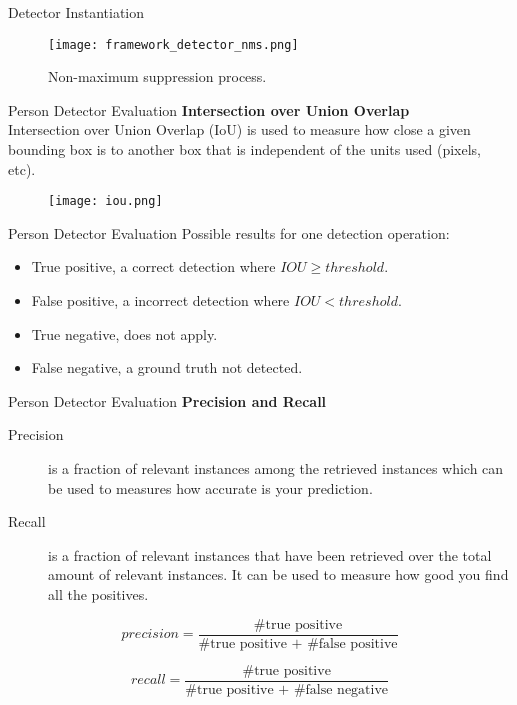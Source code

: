 \begin{frame}{Detector Instantiation}
    \begin{figure}
        \texttt{[image: framework\_detector\_nms.png]}
        \caption{Non-maximum suppression process.}
        \label{fig:fw-detector-nms}
    \end{figure}
\end{frame}

\begin{frame}{Person Detector Evaluation}
    \textbf{Intersection over Union Overlap}\\
    \vspace{10px}
    Intersection over Union Overlap (IoU) is used to measure how close a given 
    bounding box is to another box that is independent of the units used 
    (pixels, etc).
    \vspace{10px}
    \begin{figure}
        \centering
        \texttt{[image: iou.png]} 
    \end{figure}
\end{frame}

\begin{frame}{Person Detector Evaluation}
    Possible results for one detection operation:
    \begin{itemize}
        \item True positive, a correct detection where $\mathit{IOU} \geq
        \mathit{threshold}$.
        \item False positive, a incorrect detection where $\mathit{IOU} <
        \mathit{threshold}$.
        \item True negative, does not apply.
        \item False negative, a ground truth not detected.
    \end{itemize}
\end{frame}

\begin{frame}{Person Detector Evaluation}
\textbf{Precision and Recall}\\
\vspace{5px}
\begin{description}
    \item[Precision] 
    is a fraction of relevant instances among the retrieved instances which can 
    be used to measures how accurate is your prediction.
    \item[Recall]
    is a fraction of relevant instances that have been retrieved over the total 
    amount of relevant instances. It can be used to measure how good you find 
    all the positives.
\end{description}

$$
\mathit{precision} =
\frac
{\text{\# true positive}}
{\text{\# true positive + \# false positive}}
$$

$$
\label{eq:recall}
\mathit{recall} =
\frac
{\text{\# true positive}}
{\text{\# true positive + \# false negative}}
$$
\end{frame}

